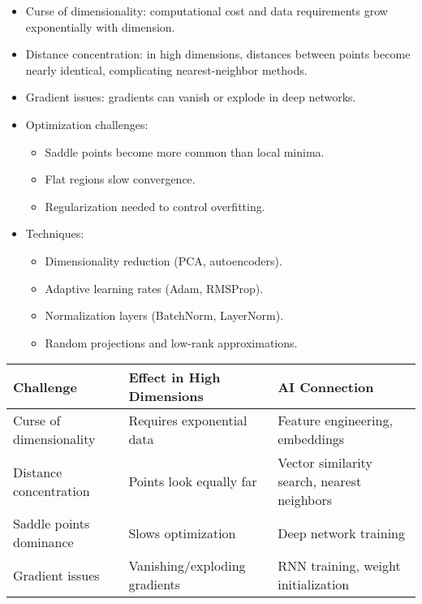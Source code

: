 \documentclass[
  letterpaper,
  DIV=11,
  numbers=noendperiod]{scrreprt}
\providecommand{\tightlist}{%
  \setlength{\itemsep}{0pt}\setlength{\parskip}{0pt}}
\begin{document}
\begin{itemize}
\item
  Curse of dimensionality: computational cost and data requirements grow
  exponentially with dimension.
\item
  Distance concentration: in high dimensions, distances between points
  become nearly identical, complicating nearest-neighbor methods.
\item
  Gradient issues: gradients can vanish or explode in deep networks.
\item
  Optimization challenges:

  \begin{itemize}
  \tightlist
  \item
    Saddle points become more common than local minima.
  \item
    Flat regions slow convergence.
  \item
    Regularization needed to control overfitting.
  \end{itemize}
\item
  Techniques:

  \begin{itemize}
  \tightlist
  \item
    Dimensionality reduction (PCA, autoencoders).
  \item
    Adaptive learning rates (Adam, RMSProp).
  \item
    Normalization layers (BatchNorm, LayerNorm).
  \item
    Random projections and low-rank approximations.
  \end{itemize}
\end{itemize}

\begin{longtable}[]{@{}
  >{\raggedright\arraybackslash}p{}
  >{\raggedright\arraybackslash}p{}
  >{\raggedright\arraybackslash}p{}@{}}
\toprule\noalign{}
\begin{minipage}[b]{\linewidth}\raggedright
Challenge
\end{minipage} & \begin{minipage}[b]{\linewidth}\raggedright
Effect in High Dimensions
\end{minipage} & \begin{minipage}[b]{\linewidth}\raggedright
AI Connection
\end{minipage} \\
\midrule\noalign{}
\endhead
\bottomrule\noalign{}
\endlastfoot
Curse of dimensionality & Requires exponential data & Feature
engineering, embeddings \\
Distance concentration & Points look equally far & Vector similarity
search, nearest neighbors \\
Saddle points dominance & Slows optimization & Deep network training \\
Gradient issues & Vanishing/exploding gradients & RNN training, weight
initialization \\
\end{longtable}
\end{document}
